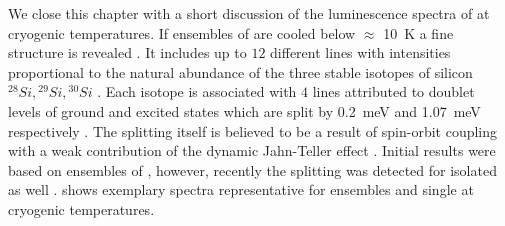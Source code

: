 


    We close this chapter with a short discussion of the luminescence spectra of \sivs at cryogenic temperatures.
    If ensembles of \sivs are cooled below $\approx$ \SI{10}{\kelvin} a fine structure is revealed \cite{neu2013low}. It includes up to $12$ different lines with intensities proportional to the natural abundance of the three stable isotopes of silicon ${}^{28}Si, {}^{29}Si, {}^{30}Si$ \cite{Clark1995}. Each isotope is associated with $4$ lines attributed to doublet levels of ground and excited states which are split by \SI{0.2}{\milli\eV} and \SI{1.07}{\milli\eV} respectively \cite{Rogers2014, Hepp2014, Clark1995}. The splitting itself is believed to be a result of spin-orbit coupling with a weak contribution of the dynamic Jahn-Teller effect \cite{Hepp2014}. Initial results were based on ensembles of \sivs, however, recently the splitting was detected for isolated \sivs as well \cite{Dietrich2014}.  shows exemplary spectra representative for ensembles and single \siv at cryogenic temperatures.

